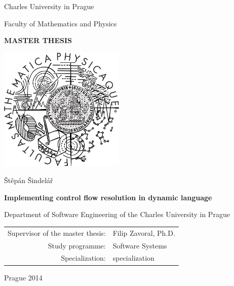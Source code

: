 \documentclass[12pt,a4paper]{report}
\begin{document}


\pagestyle{empty}
\begin{center}

\large

Charles University in Prague

\medskip

Faculty of Mathematics and Physics

\vfill

{\bf\Large MASTER THESIS}

\vfill

\centerline{\mbox{\includegraphics[width=60mm]{img/logo.pdf}}}

\vfill
\vspace{5mm}

{\LARGE Štěpán Šindelář}

\vspace{15mm}

{\LARGE\bfseries Implementing control flow resolution in dynamic language}

\vfill

Department of Software Engineering of the Charles University in Prague

\vfill

\begin{tabular}{rl}

Supervisor of the master thesis: & Filip Zavoral, Ph.D. \\
\noalign{\vspace{2mm}}
Study programme: & Software Systems \\
\noalign{\vspace{2mm}}
Specialization: & specialization \\
\end{tabular}

\vfill

Prague 2014

\end{center}
\end{document}
